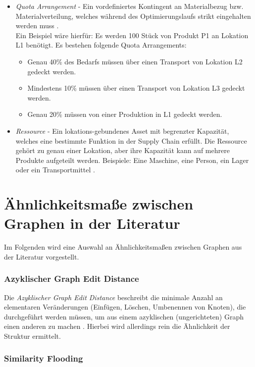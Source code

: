 \begin{itemize}
\item \textit{Quota Arrangement} - Ein vordefiniertes Kontingent an Materialbezug bzw. Materialverteilung, welches während des Optimierungslaufs strikt eingehalten werden muss \cite{.20220812c}. \\ Ein Beispiel wäre hierfür: Es werden 100 Stück von Produkt P1 an Lokation L1 benötigt. Es bestehen folgende Quota Arrangements: \begin{itemize}
\item Genau 40\% des Bedarfs müssen über einen Transport von Lokation L2 gedeckt werden.
\item Mindestens 10\% müssen über einen Transport von Lokation L3 gedeckt werden.
\item Genau 20\% müssen von einer Produktion in L1 gedeckt werden.
\end{itemize} 
\item \textit{Ressource} - Ein lokations-gebundenes Asset mit begrenzter Kapazität, welches eine bestimmte Funktion in der Supply Chain erfüllt. Die Ressource gehört zu genau einer Lokation, aber ihre Kapazität kann auf mehrere Produkte aufgeteilt werden. Beispiele: Eine Maschine, eine Person, ein Lager oder ein Transportmittel \cite{.20220812b}.
\end{itemize}

\section{Ähnlichkeitsmaße zwischen Graphen in der Literatur} \label{sec:sim_lit}

Im Folgenden wird eine Auswahl an Ähnlichkeitsmaßen zwischen Graphen aus der Literatur vorgestellt.

\subsubsection{Azyklischer Graph Edit Distance} \label{sec:sim_edit_dist}

Die \textit{Azyklischer Graph Edit Distance} beschreibt die minimale Anzahl an elementaren Veränderungen (Einfügen, Löschen, Umbenennen von Knoten), die durchgeführt werden müssen, um aus einem azyklischen (ungerichteten) Graph einen anderen zu machen \cite{Zhang.1989}. Hierbei wird allerdings rein die Ähnlichkeit der Struktur ermittelt.

\subsubsection{Similarity Flooding} \label{sec:sim_flooding}


